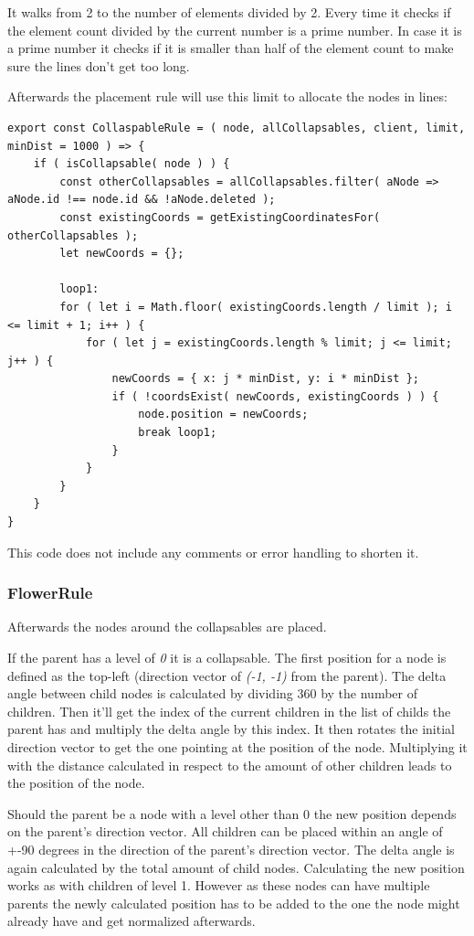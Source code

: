 It walks from 2 to the number of elements divided by 2. Every time it checks if the element count divided by the current number is a prime number. In case it is a prime number it checks if it is smaller than half of the element count to make sure the lines don't get too long.

Afterwards the placement rule will use this limit to allocate the nodes in lines:
\begin{lstlisting}
export const CollaspableRule = ( node, allCollapsables, client, limit, minDist = 1000 ) => {
	if ( isCollapsable( node ) ) {
		const otherCollapsables = allCollapsables.filter( aNode => aNode.id !== node.id && !aNode.deleted );
		const existingCoords = getExistingCoordinatesFor( otherCollapsables );
		let newCoords = {};

		loop1:
		for ( let i = Math.floor( existingCoords.length / limit ); i <= limit + 1; i++ ) {
			for ( let j = existingCoords.length % limit; j <= limit; j++ ) {
				newCoords = { x: j * minDist, y: i * minDist };
				if ( !coordsExist( newCoords, existingCoords ) ) {
					node.position = newCoords;
					break loop1;
				}
			}
		} 
	}
}
\end{lstlisting}
This code does not include any comments or error handling to shorten it.

\subsubsection{FlowerRule}
Afterwards the nodes around the collapsables are placed. 

If the parent has a level of \emph{0} it is a collapsable. The first position for a node is defined as the top-left (direction vector of \emph{(-1, -1)} from the parent). The delta angle between child nodes is calculated by dividing 360 by the number of children. Then it'll get the index of the current children in the list of childs the parent has and multiply the delta angle by this index. It then rotates the initial direction vector to get the one pointing at the position of the node. Multiplying it with the distance calculated in respect to the amount of other children leads to the position of the node.

Should the parent be a node with a level other than 0 the new position depends on the parent's direction vector. All children can be placed within an angle of +-90 degrees in the direction of the parent's direction vector. The delta angle is again calculated by the total amount of child nodes. Calculating the new position works as with children of level 1. However as these nodes can have multiple parents the newly calculated position has to be added to the one the node might already have and get normalized afterwards.

